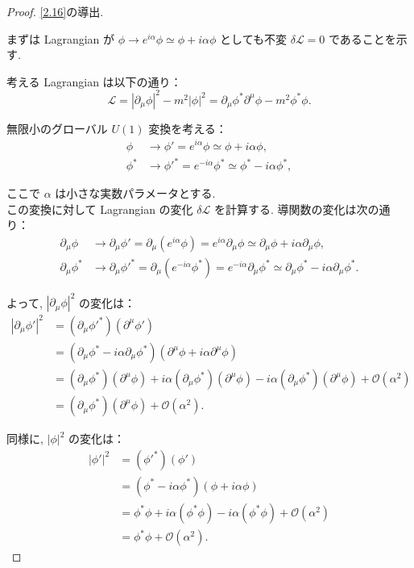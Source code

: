 \documentclass[a4paper,12pt]{article}
\begin{document}
\begin{proof}
\eqref{2.16}の導出.\par
まずは Lagrangian が $\phi \to e^{i\alpha} \phi \simeq \phi + i\alpha \phi$ としても不変 $\delta \mathcal{L} = 0$ であることを示す.

考える Lagrangian は以下の通り：
\begin{equation*}
\mathcal{L} = |\partial_\mu \phi|^2 - m^2 |\phi|^2
= \partial_\mu \phi^* \partial^\mu \phi - m^2 \phi^* \phi. \tag{2-2.g1}
\end{equation*}

無限小のグローバル $U(1)$ 変換を考える：
\begin{align*}
\phi &\to \phi' = e^{i\alpha} \phi \simeq \phi + i\alpha \phi, \tag{2-2.g2}\\
\phi^* &\to \phi'^* = e^{-i\alpha} \phi^* \simeq \phi^* - i\alpha \phi^*, \tag{2-2.g3}
\end{align*}

ここで $\alpha$ は小さな実数パラメータとする.\\
この変換に対して Lagrangian の変化 $\delta \mathcal{L}$ を計算する. 導関数の変化は次の通り：
\begin{align*}
\partial_\mu \phi &\to \partial_\mu \phi' = \partial_\mu (e^{i\alpha} \phi) = e^{i\alpha} \partial_\mu \phi \simeq \partial_\mu \phi + i\alpha \partial_\mu \phi, \tag{2-2.g4}\\
\partial_\mu \phi^* &\to \partial_\mu \phi'^* = \partial_\mu (e^{-i\alpha} \phi^*) = e^{-i\alpha} \partial_\mu \phi^* \simeq \partial_\mu \phi^* - i\alpha \partial_\mu \phi^*. \tag{2-2.g5}
\end{align*}

よって, $|\partial_\mu \phi|^2$ の変化は：
\begin{align*}
|\partial_\mu \phi'|^2 &= (\partial_\mu \phi'^*)(\partial^\mu \phi')  \tag{2-2.g6}\\
&= (\partial_\mu \phi^* - i\alpha \partial_\mu \phi^*)(\partial^\mu \phi + i\alpha \partial^\mu \phi)  \tag{2-2.g7}\\
&= (\partial_\mu \phi^*)(\partial^\mu \phi) + i\alpha (\partial_\mu \phi^*)(\partial^\mu \phi) - i\alpha (\partial_\mu \phi^*)(\partial^\mu \phi) + \mathcal{O}(\alpha^2)  \tag{2-2.g8}\\
&= (\partial_\mu \phi^*)(\partial^\mu \phi) + \mathcal{O}(\alpha^2). \tag{2-2.g9}
\end{align*}

同様に, $|\phi|^2$ の変化は：
\begin{align*}
|\phi'|^2 &= (\phi'^*)(\phi')  \tag{2-2.g10}\\
&= (\phi^* - i\alpha \phi^*)(\phi + i\alpha \phi)  \tag{2-2.g11}\\
&= \phi^* \phi + i\alpha (\phi^* \phi) - i\alpha (\phi^* \phi) + \mathcal{O}(\alpha^2)  \tag{2-2.g12}\\
&= \phi^* \phi + \mathcal{O}(\alpha^2). \tag{2-2.g13}
\end{align*}


\end{proof}
\end{document}
